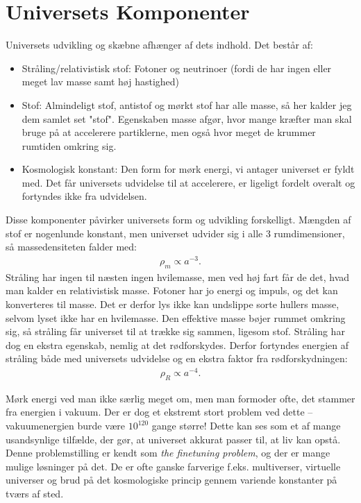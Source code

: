 \section{Universets Komponenter} \label{bestanddele}
Universets udvikling og skæbne afhænger af dets indhold. Det består af:
\begin{itemize}
	\item Stråling/relativistisk stof: Fotoner og neutrinoer (fordi de har ingen eller meget lav masse samt høj hastighed)
	\item Stof: Almindeligt stof, antistof og mørkt stof har alle masse, så her kalder jeg dem samlet set "stof". Egenskaben masse afgør, hvor mange kræfter man skal bruge på at accelerere partiklerne, men også hvor meget de krummer rumtiden omkring sig. 
	\item Kosmologisk konstant: Den form for mørk energi, vi antager universet er fyldt med. Det får universets udvidelse til at accelerere, er ligeligt fordelt overalt og fortyndes ikke fra udvidelsen.
\end{itemize}

Disse komponenter påvirker universets form og udvikling forskelligt. Mængden af stof er nogenlunde konstant, men universet udvider sig i alle 3 rumdimensioner, så massedensiteten falder med:
\begin{align}
\rho_m \propto a^{-3}.
\end{align}
Stråling har ingen til næsten ingen hvilemasse, men ved høj fart får de det, hvad man kalder en relativistisk masse. Fotoner har jo energi og impuls, og det kan konverteres til masse. Det er derfor lys ikke kan undslippe sorte hullers masse, selvom lyset ikke har en hvilemasse. Den effektive masse bøjer rummet omkring sig, så stråling får universet til at trække sig sammen, ligesom stof. Stråling har dog en ekstra egenskab, nemlig at det rødforskydes. Derfor fortyndes energien af stråling både med universets udvidelse og en ekstra faktor fra rødforskydningen:
\begin{align}
\rho_R\propto a^{-4}.
\end{align}

Mørk energi ved man ikke særlig meget om, men man formoder ofte, det stammer fra energien i vakuum. Der er dog et ekstremt stort problem ved dette -- vakuumenergien burde være $10^{120}$ gange større! Dette kan ses som et af mange usandsynlige tilfælde, der gør, at universet akkurat passer til, at liv kan opstå. Denne problemstilling er kendt som \emph{the finetuning problem}, og der er mange mulige løsninger på det. De er ofte ganske farverige f.eks. multiverser, virtuelle universer og brud på det kosmologiske princip gennem variende konstanter på tværs af sted. %

